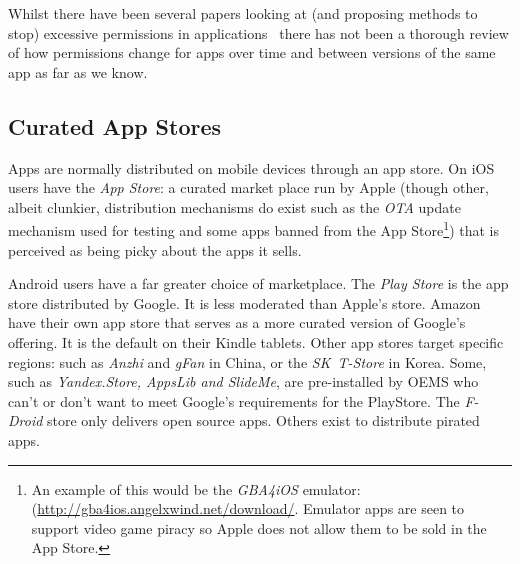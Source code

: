 \documentclass[a4paper]{article}
\begin{document}
Whilst there have been several papers looking at (and proposing methods to stop)
excessive permissions in applications~\cite{Felt:2011kj,Vidas:2011wr} there
has not been a thorough review of how permissions change for apps over time
and between versions of the same app as far as we know. 



\subsection{Curated App Stores}

Apps are normally distributed on mobile devices through an app
store.  On iOS users have the \emph{App Store}: a curated market place run by
Apple (though other, albeit clunkier, distribution mechanisms do exist such as
the \emph{\ac{OTA}} update mechanism used for testing and some apps banned from
the App Store\footnote{An example of this would be the \emph{GBA4iOS} emulator:
(\url{http://gba4ios.angelxwind.net/download/}.  Emulator apps are seen to
support video game piracy so Apple does not allow them to be sold in the App
Store.}) that is perceived as being picky about the apps it sells.

Android users have a far greater choice of marketplace.  The \emph{Play Store}
is the app store distributed by Google. It is less moderated than Apple's store.
Amazon have their own app store that serves as a more curated version of
Google's offering. It is the default on their Kindle tablets.  Other app stores
target specific regions: such as \emph{Anzhi} and \emph{gFan} in China, or the \emph{SK~T-Store}
in Korea.  Some, such as \emph{Yandex.Store, AppsLib and SlideMe}, are
pre-installed by OEMS who can't or don't want to meet Google's requirements for
the PlayStore.  The \emph{F-Droid} store only delivers open source apps. Others
exist to distribute pirated apps. 
\end{document}
